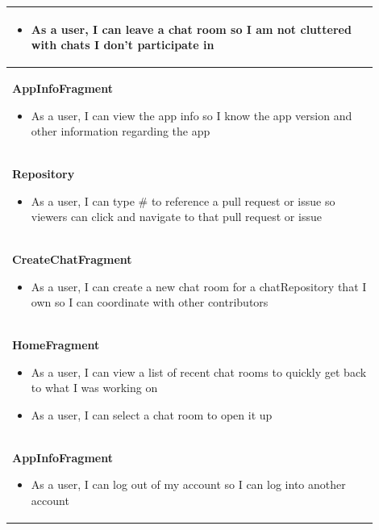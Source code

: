 \documentclass{report}
\begin{document}
\begin{center}
\begin{tabular}{ | p{0.9\linewidth} |}
\begin{itemize}
                                  \item As a user, I can leave a chat room so I am not cluttered with chats I don't participate in
                              \end{itemize}                                     \\
    \hline
    \textbf{AppInfoFragment} \begin{itemize}
                                 \item As a user, I can view the app info so I know the app version and other information regarding the app
                             \end{itemize}                     \\
    \hline
    \textbf{Repository} \begin{itemize}
                            \item As a user, I can type \# to reference a pull request or issue so viewers can click and navigate to that pull request or issue
                        \end{itemize} \\
    \hline
    \textbf{CreateChatFragment} \begin{itemize}
                                    \item As a user, I can create a new chat room for a chatRepository that I own so I can coordinate with other contributors
                                \end{itemize}       \\
    \hline
    \textbf{HomeFragment} \begin{itemize}
                              \item As a user, I can view a list of recent chat rooms to quickly get back to what I was working on
                              \item As a user, I can select a chat room to open it up
                          \end{itemize}                              \\
    \hline
    \textbf{AppInfoFragment} \begin{itemize}
            \item As a user, I can log out of my account so I can log into another account
    \end{itemize} \\
    \hline
    \end{tabular}
\end{center}
\newpage
\end{document}
